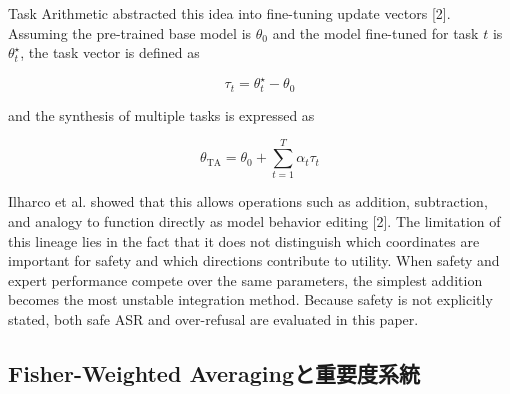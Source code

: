 \documentclass{article}
\begin{document}
Task Arithmetic abstracted this idea into fine-tuning update vectors [2]. Assuming the pre-trained base model is $\theta_0$ and the model fine-tuned for task $t$ is $\theta_t^\star$, the task vector is defined as

\[
\tau_t=\theta_t^\star-\theta_0
\tag{2}
\]

and the synthesis of multiple tasks is expressed as

\[
\theta_{\mathrm{TA}}=\theta_0+\sum_{t=1}^{T}\alpha_t\tau_t
\tag{3}
\]

Ilharco et al. showed that this allows operations such as addition, subtraction, and analogy to function directly as model behavior editing [2]. The limitation of this lineage lies in the fact that it does not distinguish which coordinates are important for safety and which directions contribute to utility. When safety and expert performance compete over the same parameters, the simplest addition becomes the most unstable integration method. Because safety is not explicitly stated, both safe ASR and over-refusal are evaluated in this paper.

\subsection{Fisher-Weighted Averagingと重要度系統}






\end{document}
